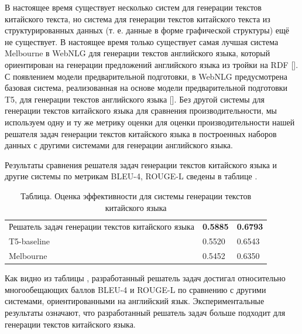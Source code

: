 В настоящее время существует несколько систем для генерации текстов китайского текста, но система для генерации текстов китайского текста из структурированных данных (т. е. данные в форме графической структуры) ещё не существует. В настоящее время только существует самая лучшая система Melbourne в WebNLG для генерации текстов английского языка, который ориентирован на генерации предложений английского языка из тройки на RDF []. С появлением модели предварительной подготовки, в WebNLG предусмотрена базовая система, реализованная на основе модели предварительной подготовки T5, для генерации текстов английского языка []. Без другой системы для генерации текстов китайского языка для сравнения производительности, мы используем одну и ту же метрику оценки для оценки производительности нашей решателя задач генерации текстов китайского языка в построенных наборов данных с другими системами для генерации английского языка.

Результаты сравнения решателя задач генерации текстов китайского языка и другие системы по метрикам BLEU-4, ROUGE-L сведены в таблице \textit{}.

\renewcommand\arraystretch{2}
\begin{table}[]
	\caption{Таблица. Оценка эффективности для системы генерации текстов китайского языка}
	\centering
	\begin{tabular}{|m{8em}|m{8em}|m{8em}|}
		\hline
		{}& \makecell[c]{BLEU-4} & \makecell[c]{ROUGE-L} \\
		\hline 
		Решатель задач генерации текстов китайского языка & \textbf{0.5885} & \textbf{0.6793} \\
		\hline
		T5-baseline & 0.5520 & 0.6543 \\
		\hline
		Melbourne & 0.5452 & 0.6350 \\
		\hline
	\end{tabular}
	\label{table:text-generation}
\end{table}

Как видно из таблицы \textit{}, разработанный решатель задач достигал относительно многообещающих баллов BLEU-4 и ROUGE-L по сравнению с другими системами, ориентированными на английский язык. Экспериментальные результаты означают, что разработанный решатель задач больше подходит для генерации текстов китайского языка. 

